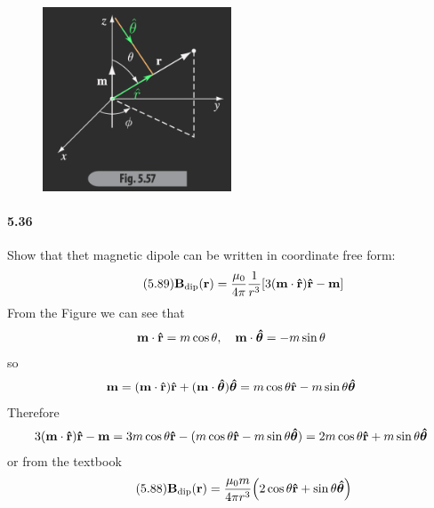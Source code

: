 \documentclass[../main.tex]{subfiles}
\begin{document}
\newpage
\begin{figure}[ht]
    \centering
    \includegraphics[width=0.5\textwidth]{hw9_1.png}
    \label{fig:5.32}
\end{figure}
\paragraph{5.36} Show that thet magnetic dipole can be written in coordinate free form:
\begin{align*}\tag{5.89} \label{eq:5.89}
    \vb B_\text{dip} (\vb r) = \frac{\mu_0}{4\pi} \frac{1}{r^3} [
        3 (\vb m \cdot \vu r) \vu r - \vb m
    ] 
\end{align*}
From the Figure we can see that
\begin{align*}
    \vb m \cdot \vu r = m \cos\theta, \quad \vb m \cdot \vu*\theta = -m \sin\theta
\end{align*}
so
\begin{align*}
    \vb m = (\vb m \cdot \vu r) \vu r + (\vb m \cdot \vu*\theta) \vu*\theta = m \cos\theta \vu r - m \sin\theta \vu*\theta
\end{align*}
Therefore
\begin{align*}
    3(\vb m \cdot \vu r) \vu r - \vb m = 3m \cos\theta \vu r - (m \cos\theta \vu r - m \sin\theta \vu*\theta) = 2m \cos\theta \vu r + m \sin\theta \vu*\theta
\end{align*}
or from the textbook
\begin{align*} \tag{5.88}
    \vb B_\text{dip} (\vb r) = \frac{\mu_0 m}{4\pi r^3} \qt(
        2 \cos\theta \vu r + \sin\theta \vu*\theta
    )
\end{align*}

\newpage
\end{document}
